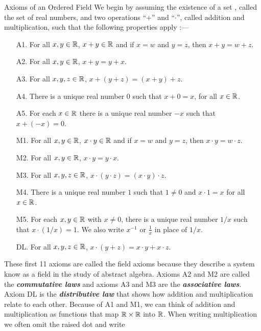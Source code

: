 \documentclass[12pt]{article}
\begin{document}
\begin{definition}{Axioms of an Ordered Field}
  We begin by assuming the existence of a set \Real, called the set of real
  numbers, and two operations ``+'' and ``$\cdot$'', called addition and
  multiplication, such that the following properties apply :---
  \begin{itemize}
  \item [A1. ] For all $x,y \in \mathbb{R}$, $x + y \in \mathbb{R}$ and if $x = w$ and $y
    = z$, then $x + y = w + z$.
  \item [A2. ] For all $x,y \in \mathbb{R}$, $x + y = y + x$.
  \item [A3. ] For all $x,y,z \in \mathbb{R}$, $x + (y + z) = (x + y) + z$.
  \item [A4. ] There is a unique real number $0$ such that $x + 0 = x$, for all
    $x \in \mathbb{R}$.
  \item [A5. ] For each $x \in \mathbb{R}$ there is a unique real number $-x$ such
    that $x + (-x) = 0$.
  \item [M1. ] For all $x,y \in \mathbb{R}$, $x \cdot y \in \mathbb{R}$ and if $x = w$ and
    $y = z$, then $x \cdot y = w \cdot z$.
  \item [M2. ] For all $x,y \in \mathbb{R}$, $x \cdot y = y \cdot x$.
  \item [M3. ] For all $x,y,z \in \mathbb{R}$, $x \cdot (y \cdot z) =(x \cdot y)
    \cdot z$.
  \item [M4. ] There is a unique real number $1$ such that $1 \ne 0$ and $x
    \cdot 1 = x$ for all $x \in \mathbb{R}$.
  \item [M5. ] For each $x,y \in \mathbb{R}$ with $x \ne 0$, there is a unique real
    number $1/x$ such that $x \cdot (1/x) = 1$. We also write $x^{-1}$ or
    $\frac{1}{x}$ in place of $1/x$.
  \item [DL. ] For all $x,y,z \in \mathbb{R}$, $x \cdot (y + z) = x \cdot y + x \cdot
    z$.
  \end{itemize}
  \begin{remark}
    These first 11 axioms are called the field axioms because they describe a
    system know as a field in the study of abstract algebra. Axioms A2 and M2
    are called the \textit{\textbf{commutative laws}} and axioms A3 and M3 are
    the \textit{\textbf{associative laws}}. Axiom DL is the
    \textit{\textbf{distributive law}} that shows how addition and
    multiplication relate to each other. Because of A1 and M1, we can think of
    addition and multiplication as functions that map $\mathbb{R} \times \mathbb{R}$ into
    $\mathbb{R}$. When writing multiplication we often omit the raised dot and write

\end{remark}
\end{definition}
\end{document}
